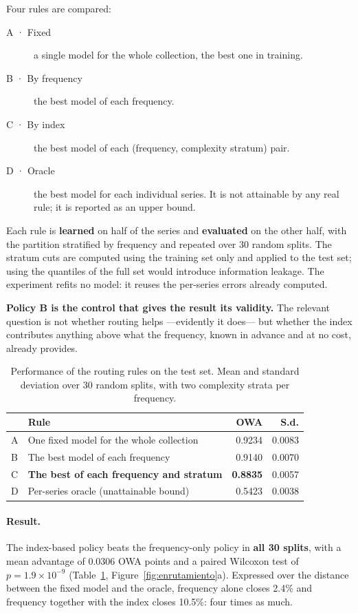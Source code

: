 Four rules are compared:

\begin{description}
\item[A · Fixed] a single model for the whole collection, the best one in training.
\item[B · By frequency] the best model of each frequency.
\item[C · By index] the best model of each (frequency, complexity stratum) pair.
\item[D · Oracle] the best model for each individual series. It is not attainable by any
      real rule; it is reported as an upper bound.
\end{description}

Each rule is \textbf{learned} on half of the series and \textbf{evaluated} on the other
half, with the partition stratified by frequency and repeated over 30 random splits. The
stratum cuts are computed using the training set only and applied to the test set; using
the quantiles of the full set would introduce information leakage. The experiment refits
no model: it reuses the per-series errors already computed.

\textbf{Policy B is the control that gives the result its validity.} The relevant question
is not whether routing helps ---evidently it does--- but whether the index contributes
anything above what the frequency, known in advance and at no cost, already provides.

\begin{table}[htbp]
\centering
\caption{Performance of the routing rules on the test set. Mean and standard deviation
over 30 random splits, with two complexity strata per frequency.}
\label{tab:enrutamiento}
\begin{tabular}{llrr}
\toprule
& \textbf{Rule} & \textbf{OWA} & \textbf{S.d.} \\
\midrule
A & One fixed model for the whole collection      & 0.9234 & 0.0083 \\
B & The best model of each frequency              & 0.9140 & 0.0070 \\
C & \textbf{The best of each frequency and stratum} & \textbf{0.8835} & 0.0057 \\
\midrule
D & Per-series oracle (unattainable bound)        & 0.5423 & 0.0038 \\
\bottomrule
\end{tabular}
\end{table}

\paragraph{Result.} The index-based policy beats the frequency-only policy in \textbf{all
30 splits}, with a mean advantage of $0.0306$ OWA points and a paired Wilcoxon test of
$p = 1.9\times10^{-9}$ (Table~\ref{tab:enrutamiento},
Figure~\ref{fig:enrutamiento}a). Expressed over the distance between the fixed model and
the oracle, frequency alone closes 2.4\% and frequency together with the index closes
10.5\%: four times as much.


